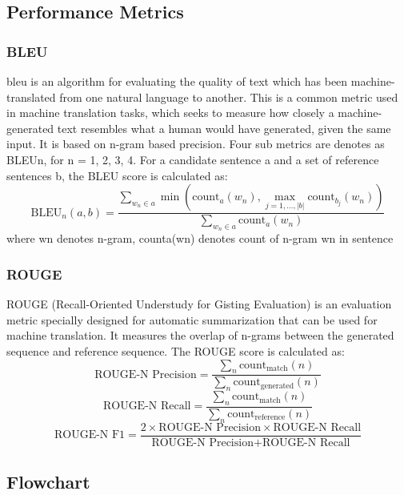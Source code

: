\documentclass{ioereport}
\begin{document}
\subsection{Performance Metrics}
\subsubsection{BLEU}
\gls{bleu} is an algorithm for evaluating the quality of
text which has been machine-translated from one natural language to another. This is
a common metric used in machine translation tasks, which seeks to measure how
closely a machine-generated text resembles what a human would have generated, given
the same input. It is based on n-gram based precision. Four sub metrics are denotes as
BLEUn, for n = 1, 2, 3, 4. For a candidate sentence a and a set of reference sentences
b, the BLEU score is calculated as:
\begin{equation}
\text{BLEU}_n(a, b) = \frac{\sum_{w_n \in a} \min\left(\text{count}_a(w_n), \max_{j=1, \ldots, |b|} \text{count}_{b_j}(w_n)\right)}{\sum_{w_n \in a} \text{count}_a(w_n)}
\end{equation}
where wn denotes n-gram, counta(wn) denotes count of n-gram wn in sentence
\subsubsection{ROUGE}
ROUGE (Recall-Oriented Understudy for Gisting Evaluation) is an evaluation metric
specially designed for automatic summarization that can be used for machine
translation. It measures the overlap of n-grams between the generated sequence and
reference sequence. The ROUGE score is calculated as:
\begin{equation}
\text{ROUGE-N Precision} = \frac{\sum_{n}\text{count}_{\text{match}}(n)}{\sum_{n}\text{count}_{\text{generated}}(n)}
\end{equation}
\begin{equation}
\text{ROUGE-N Recall} = \frac{\sum_{n}\text{count}_{\text{match}}(n)}{\sum_{n}\text{count}_{\text{reference}}(n)}
\end{equation}
\begin{equation}
\text{ROUGE-N F1} = \frac{2 \times \text{ROUGE-N Precision} \times \text{ROUGE-N Recall}}{\text{ROUGE-N Precision} + \text{ROUGE-N Recall}}
\end{equation}





\subsection{Flowchart}
\end{document}
